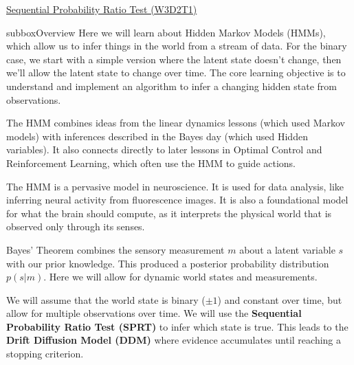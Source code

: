 \begin{textbox}{\href{https://compneuro.neuromatch.io/tutorials/W3D2_HiddenDynamics/student/W3D2_Tutorial1.html}{Sequential Probability Ratio Test (W3D2T1)}   }
\begin{subbox}{subbox}{Overview}
\scriptsize
Here we will learn about Hidden Markov Models (HMMs), which allow us to infer things in the world from a stream of data. For the binary case, we start with a simple version where the latent state doesn’t change, then we’ll allow the latent state to change over time. The core learning objective is to understand and implement an algorithm to infer a changing hidden state from observations.

The HMM combines ideas from the linear dynamics lessons (which used Markov models) with inferences described in the Bayes day (which used Hidden variables). It also connects directly to later lessons in Optimal Control and Reinforcement Learning, which often use the HMM to guide actions.

The HMM is a pervasive model in neuroscience. It is used for data analysis, like inferring neural activity from fluorescence images. It is also a foundational model for what the brain should compute, as it interprets the physical world that is observed only through its senses.

Bayes' Theorem combines the sensory measurement $m$ about a latent variable $s$ with our prior knowledge. This produced a posterior probability distribution $p(s|m)$. Here we will allow for dynamic world states and measurements.

 We will assume that the world state is binary ($\pm 1$) and constant over time, but allow for multiple observations over time. We will use the \textbf{Sequential Probability Ratio Test (SPRT)} to infer which state is true. This leads to the \textbf{Drift Diffusion Model (DDM)} where evidence accumulates until reaching a stopping criterion.

\end{subbox}



\end{textbox}
